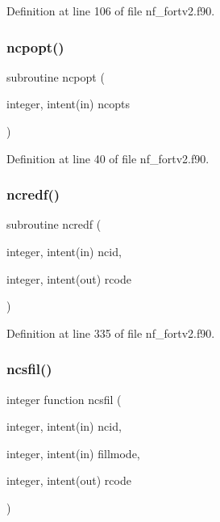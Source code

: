 Definition at line 106 of file nf\+\_\+fortv2.\+f90.

\mbox{\label{nf__fortv2_8f90_aa99b1352748c769427ead3bfaf123fff}} 
\subsubsection{\texorpdfstring{ncpopt()}{ncpopt()}}
{\footnotesize\ttfamily subroutine ncpopt (\begin{DoxyParamCaption}\item[{integer, intent(in)}]{ncopts }\end{DoxyParamCaption})}



Definition at line 40 of file nf\+\_\+fortv2.\+f90.

\mbox{\label{nf__fortv2_8f90_a162a5ab1076c10c2228e36ee9ff00677}} 
\subsubsection{\texorpdfstring{ncredf()}{ncredf()}}
{\footnotesize\ttfamily subroutine ncredf (\begin{DoxyParamCaption}\item[{integer, intent(in)}]{ncid,  }\item[{integer, intent(out)}]{rcode }\end{DoxyParamCaption})}



Definition at line 335 of file nf\+\_\+fortv2.\+f90.

\mbox{\label{nf__fortv2_8f90_a2182af2d10b5f7be720d59d9c2214cfb}} 
\subsubsection{\texorpdfstring{ncsfil()}{ncsfil()}}
{\footnotesize\ttfamily integer function ncsfil (\begin{DoxyParamCaption}\item[{integer, intent(in)}]{ncid,  }\item[{integer, intent(in)}]{fillmode,  }\item[{integer, intent(out)}]{rcode }\end{DoxyParamCaption})}



